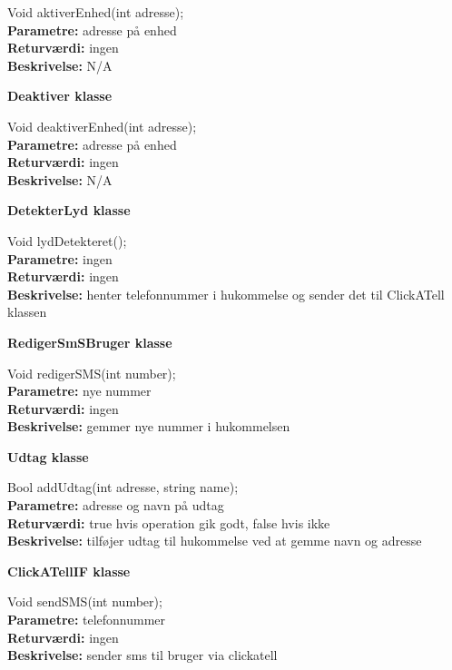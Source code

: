 Void aktiverEnhed(int adresse); \\
\textbf{Parametre:} adresse på enhed \\
\textbf{Returværdi:} ingen \\
\textbf{Beskrivelse:} N/A \\

{\centering 
\textbf{Deaktiver klasse}\par
}

Void deaktiverEnhed(int adresse); \\
\textbf{Parametre:} adresse på enhed \\
\textbf{Returværdi:} ingen \\
\textbf{Beskrivelse:} N/A \\

{\centering 
\textbf{DetekterLyd klasse}\par
}

Void lydDetekteret(); \\
\textbf{Parametre:} ingen \\
\textbf{Returværdi:} ingen \\
\textbf{Beskrivelse:} henter telefonnummer i hukommelse og sender det til ClickATell klassen \\

{\centering 
\textbf{RedigerSmSBruger klasse}\par
}

Void redigerSMS(int number); \\
\textbf{Parametre:} nye nummer \\
\textbf{Returværdi:} ingen \\
\textbf{Beskrivelse:} gemmer nye nummer i hukommelsen \\

{\centering 
\textbf{Udtag klasse}\par
}

Bool addUdtag(int adresse, string name); \\
\textbf{Parametre:} adresse og navn på udtag \\
\textbf{Returværdi:} true hvis operation gik godt, false hvis ikke \\
\textbf{Beskrivelse:} tilføjer udtag til hukommelse ved at gemme navn og adresse \\

{\centering 
\textbf{ClickATellIF klasse}\par
}

Void sendSMS(int number); \\
\textbf{Parametre:} telefonnummer \\
\textbf{Returværdi:} ingen \\
\textbf{Beskrivelse:} sender sms til bruger via clickatell \\

